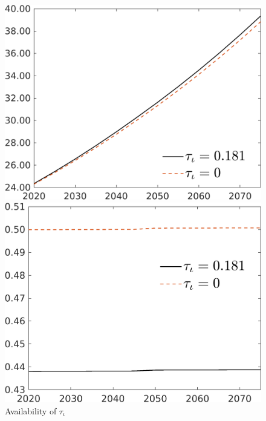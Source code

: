 \begin{figure}[h!!]
	\centering
	\caption{Availability of $\tau_{\iota}$ }\label{fig:CompTaul}
		
	\begin{minipage}[]{0.32\textwidth}
		\includegraphics[width=1\textwidth]{../../codding_model/own_basedOnFried/optimalPol_010922_revision/figures/all_5Sept22/CompTaul_Reg7_A_spillover0_nsk0_xgr0_sep1_LFlimit1_emsbase0_countec0_GovRev1_etaa0.79_lgd1.png}
	\end{minipage}
	\begin{minipage}[]{0.32\textwidth}
	\includegraphics[width=1\textwidth]{../../codding_model/own_basedOnFried/optimalPol_010922_revision/figures/all_5Sept22/CompTaul_Reg7_hh_spillover0_nsk0_xgr0_sep1_LFlimit1_emsbase0_countec0_GovRev1_etaa0.79_lgd1.png}

\end{minipage}
\end{figure}
